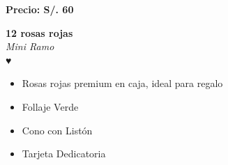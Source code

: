 \documentclass{article}
\begin{document}
\vspace{0.3cm}
\begin{center}
   \textbf{\Large Precio: \textcolor{cpred}{S/. 60 }}
\end{center}
\vspace{1cm}
\noindent
\begin{minipage}{0.6\textwidth}
    \textcolor{cpred}{\textbf{\huge 12 rosas rojas }}\\
    {\textit{Mini Ramo}} \\
    \textcolor{cpred}{\Huge ♥} \\
    \vspace{0.5cm}
    \begin{itemize}
        \item Rosas rojas premium en caja, ideal para regalo
        \item Follaje Verde
        \item Cono con Listón
        \item Tarjeta Dedicatoria
    \end{itemize}
\end{minipage}
\hspace{1cm}
\end{document}

